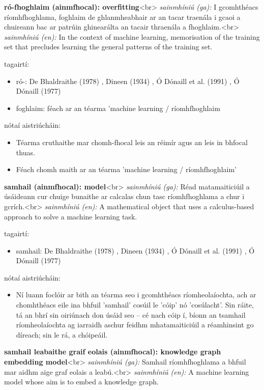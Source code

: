 \documentclass{article}
\begin{document}
\textbf{ró-fhoghlaim (ainmfhocal): overfitting}<br>
\textit{sainmhíniú (ga):} I gcomhthéacs ríomhfhoghlama, foghlaim de ghlanmheabhair ar an tacar traenála i gcaoi a chuireann bac ar patrúin ghinearálta an tacair thraenála a fhoghlaim.<br>
\textit{sainmhíniú (en):} In the context of machine learning, memorisation of the training set that precludes learning the general patterns of the training set.

tagairtí:
\begin{itemize}
	\item ró-: De Bhaldraithe (1978) \cite{de-bhaldraithe}, Dineen (1934) \cite{dineen}, Ó Dónaill et al. (1991) \cite{focloir-beag}, Ó Dónaill (1977) \cite{odonaill}
	\item foghlaim: féach ar an téarma 'machine learning / ríomhfhoghlaim
\end{itemize}

nótaí aistriúcháin:
\begin{itemize}
	\item Téarma cruthaithe mar chomh-fhocal leis an réimír agus an leis in bhfocal thuas.
	\item Féach chomh maith ar an téarma 'machine learning / ríomhfhoghlaim'
\end{itemize}


\textbf{samhail (ainmfhocal): model}<br>
\textit{sainmhíniú (ga):} Réad matamaiticiúil a úsáideann cur chuige bunaithe ar calcalas chun tasc ríomhfhoghlama a chur i gcrích.<br>
\textit{sainmhíniú (en):} A mathematical object that uses a calculus-based approach to solve a machine learning task.

tagairtí:
\begin{itemize}
	\item samhail: De Bhaldraithe (1978) \cite{de-bhaldraithe}, Dineen (1934) \cite{dineen}, Ó Dónaill et al. (1991) \cite{focloir-beag}, Ó Dónaill (1977) \cite{odonaill}
\end{itemize}

nótaí aistriúcháin:
\begin{itemize}
	\item Ní luann foclóir ar bith an téarma seo i gcomhthéacs ríomheolaíochta, ach ar chomhthéacs eile ina bhfuil 'samhail' cosúil le 'cóip' nó 'cosúlacht'. Sin ráite, tá an bhrí sin oiriúnach don úsáid seo -- cé nach cóip í, bíonn an tsamhail ríomheolaíochta ag iarraidh aschur feidhm mhatamaiticiúil a réamhinsint go díreach; sin le rá, a chóipeáil.
\end{itemize}


\textbf{samhail leabaithe graif eolais (ainmfhocal): knowledge graph embedding model}<br>
\textit{sainmhíniú (ga):} Samhail ríomhfhoghlama a bhfuil mar aidhm aige graf eolais a leabú.<br>
\textit{sainmhíniú (en):} A machine learning model whose aim is to embed a knowledge graph.
\end{document}
